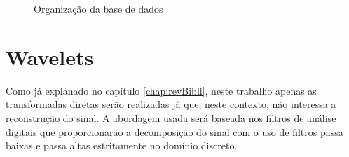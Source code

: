 \begin{myenv}{1.5}
			\begin{figure}
				\center
				\caption{Organização da base de dados}
				\label{fig:directorystructlevel010203}
			\end{figure}
		
		\section{Wavelets}
			\par Como já explanado no capítulo \ref{chap:revBibli}, neste trabalho apenas as transformadas diretas serão realizadas já que, neste contexto, não interessa a reconstrução do sinal. A abordagem usada será baseada nos filtros de análise digitais que proporcionarão a decomposição do sinal com o uso de filtros passa baixas e passa altas estritamente no domínio discreto.


\end{myenv}
